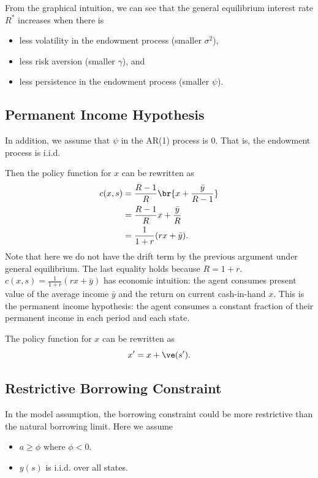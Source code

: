 From the graphical intuition, we can see that the general equilibrium interest rate $R^*$ increases when there is 
\begin{itemize}
    \item less volatility in the endowment process (smaller $\sigma^2$),
    \item less risk aversion (smaller $\gamma$), and 
    \item less persistence in the endowment process (smaller $\psi$).
\end{itemize}

\subsection{Permanent Income Hypothesis}

In addition, we assume that $\psi$ in the AR(1) process is 0. That is, the endowment process is i.i.d. 

Then the policy function for $x$ can be rewritten as
\[
\begin{aligned}
    c(x,s) & = \frac{R-1}{R}\br{x+\frac{\bar y}{R-1}} \\
    & = \frac{R-1}{R}x+\frac{\bar y}{R} \\
    & = \frac{1}{1+r}(rx+\bar y).
\end{aligned}
\]
Note that here we do not have the drift term by the previous argument under general equilibrium. The last equality holds because $R = 1+r$. $c(x,s) = \frac{1}{1+r}(rx+\bar y)$ has economic intuition: the agent consumes present value of the average income $\bar y$ and the return on current cash-in-hand $x$. This is the permanent income hypothesis: the agent consumes a constant fraction of their permanent income in each period and each state.

The policy function for $x$ can be rewritten as
\[
x' = x+\ve(s').
\]

\subsection{Restrictive Borrowing Constraint}

In the model assumption, the borrowing constraint could be more restrictive than the natural borrowing limit. Here we assume
\begin{itemize}
    \item $a\ge\phi$ where $\phi <0$.
    \item $y(s)$ is i.i.d. over all states.
\end{itemize}


